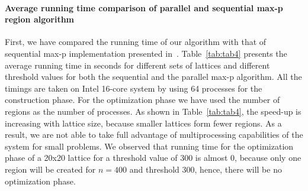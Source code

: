 \documentclass[conference]{IEEEtran}
\begin{document}
\paragraph{Average running time comparison of parallel and sequential max-p region algorithm}
First, we have compared the running time of our algorithm with that of sequential max-p
implementation presented in~\cite{r1}. Table~\ref{tab:tab4} presents the average
running time in seconds for different sets of lattices and different threshold
values for both the sequential and the parallel max-p algorithm. All the timings are taken on Intel 16-core system by using 64 processes for the construction phase. For the optimization phase we have used the number of regions as the number of processes. As shown in Table~\ref{tab:tab4}, the speed-up is increasing with lattice size, because smaller lattices form fewer regions. As a result, we are not able to take full advantage of multiprocessing capabilities of the system for small problems. We observed that running time for the optimization phase of a 20x20 lattice for a threshold value of 300 is almost 0, because only one region will be created for $n = 400$ and threshold 300, hence, there will be no optimization phase.
\end{document}
